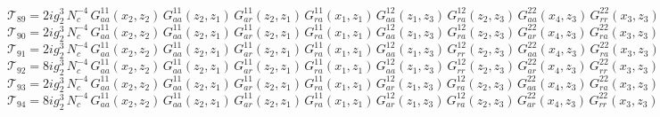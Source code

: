 \documentclass{article}
\begin{document}
\begin{equation*}
\mathcal{T}_{89} = 2 i g_{2}^{3}\,N_c^{-4}\,G^{11}_{aa}\left(x_2,z_{2}\right) \, G^{11}_{aa}\left(z_{2},z_{1}\right) \, G^{11}_{ar}\left(z_{2},z_{1}\right) \, G^{11}_{ra}\left(x_1,z_{1}\right) \, G^{12}_{aa}\left(z_{1},z_{3}\right) \, G^{12}_{ra}\left(z_{2},z_{3}\right) \, G^{22}_{aa}\left(x_4,z_{3}\right) \, G^{22}_{rr}\left(x_3,z_{3}\right)
\end{equation*}
\begin{equation*}
\mathcal{T}_{90} = 2 i g_{2}^{3}\,N_c^{-4}\,G^{11}_{aa}\left(x_2,z_{2}\right) \, G^{11}_{aa}\left(z_{2},z_{1}\right) \, G^{11}_{ar}\left(z_{2},z_{1}\right) \, G^{11}_{ra}\left(x_1,z_{1}\right) \, G^{12}_{aa}\left(z_{1},z_{3}\right) \, G^{12}_{ra}\left(z_{2},z_{3}\right) \, G^{22}_{ar}\left(x_4,z_{3}\right) \, G^{22}_{ra}\left(x_3,z_{3}\right)
\end{equation*}
\begin{equation*}
\mathcal{T}_{91} = 2 i g_{2}^{3}\,N_c^{-4}\,G^{11}_{aa}\left(x_2,z_{2}\right) \, G^{11}_{aa}\left(z_{2},z_{1}\right) \, G^{11}_{ar}\left(z_{2},z_{1}\right) \, G^{11}_{ra}\left(x_1,z_{1}\right) \, G^{12}_{aa}\left(z_{1},z_{3}\right) \, G^{12}_{rr}\left(z_{2},z_{3}\right) \, G^{22}_{aa}\left(x_4,z_{3}\right) \, G^{22}_{ra}\left(x_3,z_{3}\right)
\end{equation*}
\begin{equation*}
\mathcal{T}_{92} = 8 i g_{2}^{3}\,N_c^{-4}\,G^{11}_{aa}\left(x_2,z_{2}\right) \, G^{11}_{aa}\left(z_{2},z_{1}\right) \, G^{11}_{ar}\left(z_{2},z_{1}\right) \, G^{11}_{ra}\left(x_1,z_{1}\right) \, G^{12}_{aa}\left(z_{1},z_{3}\right) \, G^{12}_{rr}\left(z_{2},z_{3}\right) \, G^{22}_{ar}\left(x_4,z_{3}\right) \, G^{22}_{rr}\left(x_3,z_{3}\right)
\end{equation*}
\begin{equation*}
\mathcal{T}_{93} = 2 i g_{2}^{3}\,N_c^{-4}\,G^{11}_{aa}\left(x_2,z_{2}\right) \, G^{11}_{aa}\left(z_{2},z_{1}\right) \, G^{11}_{ar}\left(z_{2},z_{1}\right) \, G^{11}_{ra}\left(x_1,z_{1}\right) \, G^{12}_{ar}\left(z_{1},z_{3}\right) \, G^{12}_{ra}\left(z_{2},z_{3}\right) \, G^{22}_{aa}\left(x_4,z_{3}\right) \, G^{22}_{ra}\left(x_3,z_{3}\right)
\end{equation*}
\begin{equation*}
\mathcal{T}_{94} = 8 i g_{2}^{3}\,N_c^{-4}\,G^{11}_{aa}\left(x_2,z_{2}\right) \, G^{11}_{aa}\left(z_{2},z_{1}\right) \, G^{11}_{ar}\left(z_{2},z_{1}\right) \, G^{11}_{ra}\left(x_1,z_{1}\right) \, G^{12}_{ar}\left(z_{1},z_{3}\right) \, G^{12}_{ra}\left(z_{2},z_{3}\right) \, G^{22}_{ar}\left(x_4,z_{3}\right) \, G^{22}_{rr}\left(x_3,z_{3}\right)
\end{equation*}
\end{document}
